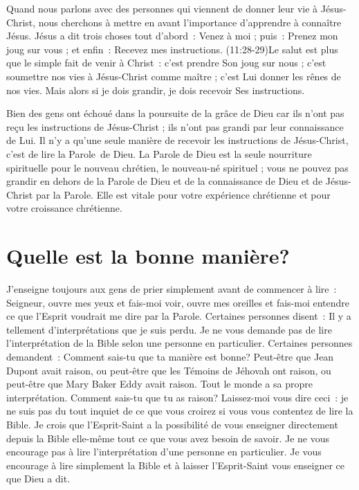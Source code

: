 Quand nous parlons avec des personnes qui viennent de donner leur vie
 à Jésus-Christ, nous cherchons à mettre en avant l'im\-por\-tance d'apprendre
 à connaître Jésus. Jésus a dit trois choses \ocadr tout d'abord~:
 \og Venez à moi \fg{} ; puis~: \og Prenez mon joug sur vous \fg{} ;
 et enfin~: \og Recevez mes instructions. \fg{}
 (11:28-29)Le salut est plus que le simple fait
 de venir à Christ~:
 c'est prendre Son joug sur nous ;
 c'est soumettre nos vies à Jésus-Christ comme maître ;
 c'est Lui donner les rênes de nos vies.
 Mais alors si je dois grandir, je dois recevoir Ses instructions.

Bien des gens ont échoué dans la poursuite de la grâce de Dieu
 car ils n'ont pas reçu les instructions de Jésus-Christ ;
 ils n'ont pas grandi par leur connaissance de Lui.
 Il n'y a qu'une seule manière de recevoir les instructions de Jésus-Christ,
 c'est de lire la Parole~de Dieu.
 La Parole de Dieu est la seule nourriture spirituelle pour le nouveau
 chrétien, le nouveau-né spirituel ; vous ne pouvez pas grandir en dehors
 de la Parole de Dieu et de la connaissance de Dieu et de Jésus-Christ
 par la Parole.
 Elle est vitale pour votre expérience  chrétienne
 et pour votre croissance chrétienne.


\section{Quelle est la bonne mani\`ere?}

J'enseigne toujours aux gens de prier simplement
 avant de commencer à lire~:
 \og Seigneur, ouvre mes yeux et fais-moi voir,
 ouvre mes oreilles et fais-moi entendre ce que l'Esprit
 voudrait me dire par la Parole. \fg{}
 Certaines personnes disent~:
 \og Il y a tellement d'in\-ter\-pré\-ta\-tions que je suis perdu. \fg{}
 Je ne vous demande pas de lire l'interprétation de la Bible
 selon une personne en particulier.
 Certaines personnes demandent~:
 \og Comment sais-tu que ta manière est bonne? Peut-être que Jean Dupont
 avait raison, ou peut-être que les Témoins de Jéhovah ont raison,
 ou peut-être que Mary Baker Eddy avait raison.
 Tout le monde a sa propre interprétation.
 Comment sais-tu que tu as raison? \fg{}
 Laissez-moi vous dire ceci~: je ne suis pas du tout inquiet
 de ce que vous croirez si vous vous contentez de lire la Bible.
 Je crois que l'Esprit-Saint a la possibilité de vous enseigner
 \ocadr directement depuis la Bible elle-même \fcadr{}
 tout ce que vous avez besoin de savoir.
 Je ne vous encourage pas à lire l'interprétation d'une personne
 en particulier. Je vous encourage à lire simplement la Bible
 et à laisser l'Esprit-Saint vous enseigner ce que Dieu a dit.

